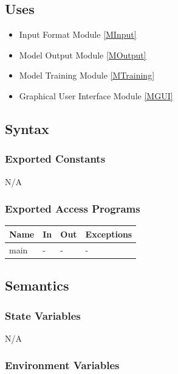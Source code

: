 \documentclass[12pt, titlepage]{article}
\begin{document}
\subsection{Uses}

\begin{itemize}
  \item Input Format Module \ref{MInput}
  \item Model Output Module \ref{MOutput}
  \item Model Training Module \ref{MTraining}
  \item Graphical User Interface Module \ref{MGUI}
\end{itemize}

\subsection{Syntax}

\subsubsection{Exported Constants}

N/A

\subsubsection{Exported Access Programs}

\begin{center}
\begin{tabular}{p{2cm} p{4cm} p{4cm} p{2cm}}
\hline
\textbf{Name} & \textbf{In} & \textbf{Out} & \textbf{Exceptions} \\
\hline
main & - & - & - \\
\hline
\end{tabular}
\end{center}

\subsection{Semantics}

\subsubsection{State Variables}

N/A

\subsubsection{Environment Variables}
\end{document}
